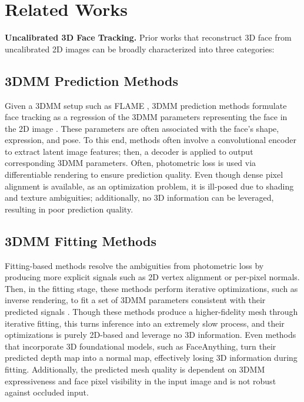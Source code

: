 \section{Related Works}
\label{sec:Related Works}

\textbf{Uncalibrated 3D Face Tracking.} Prior works that reconstruct 3D face from uncalibrated 2D images can be broadly characterized into three categories: 

\subsection{3DMM Prediction Methods}

Given a 3DMM setup such as FLAME \cite{FLAME:SiggraphAsia2017}, 3DMM prediction methods formulate face tracking as a regression of the 3DMM parameters representing the face in the 2D image \cite{emoca,deca, spark}. These parameters are often associated with the face's shape, expression, and pose. To this end, methods often involve a convolutional encoder to extract latent image features; then, a decoder is applied to output corresponding 3DMM parameters. Often, photometric loss is used via differentiable rendering to ensure prediction quality. Even though dense pixel alignment is available, as an optimization problem, it is ill-posed due to shading and texture ambiguities; additionally, no 3D information can be leveraged, resulting in poor prediction quality. 

\subsection{3DMM Fitting Methods}

Fitting-based methods resolve the ambiguities from photometric loss by producing more explicit signals such as 2D vertex alignment or per-pixel normals. Then, in the fitting stage, these methods perform iterative optimizations, such as inverse rendering, to fit a set of 3DMM parameters consistent with their predicted signals \cite{flowface,faceanything,pixel3dmm}. Though these methods produce a higher-fidelity mesh through iterative fitting, this turns inference into an extremely slow process, and their optimizations is purely 2D-based and leverage no 3D information. Even methods that incorporate 3D foundational models, such as FaceAnything, turn their predicted depth map into a normal map, effectively losing 3D information during fitting. Additionally, the predicted mesh quality is dependent on 3DMM expressiveness and face pixel visibility in the input image and is not robust against occluded input. 

